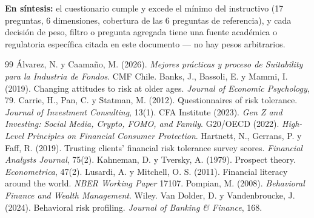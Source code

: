 \documentclass[11pt]{article}
\begin{document}
\begin{callout}
\textbf{En síntesis:} el cuestionario cumple y excede el mínimo del instructivo (17 preguntas, 6 dimensiones, cobertura de las 6 preguntas de referencia), y cada decisión de peso, filtro o pregunta agregada tiene una fuente académica o regulatoria específica citada en este documento --- no hay pesos arbitrarios.
\end{callout}

\begin{thebibliography}{99}
 Álvarez, N. y Caamaño, M. (2026). \textit{Mejores prácticas y proceso de Suitability para la Industria de Fondos}. CMF Chile.
 Banks, J., Bassoli, E. y Mammi, I. (2019). Changing attitudes to risk at older ages. \textit{Journal of Economic Psychology}, 79.
 Carrie, H., Pan, C. y Statman, M. (2012). Questionnaires of risk tolerance. \textit{Journal of Investment Consulting}, 13(1).
 CFA Institute (2023). \textit{Gen Z and Investing: Social Media, Crypto, FOMO, and Family}.
 G20/OECD (2022). \textit{High-Level Principles on Financial Consumer Protection}.
 Hartnett, N., Gerrans, P. y Faff, R. (2019). Trusting clients' financial risk tolerance survey scores. \textit{Financial Analysts Journal}, 75(2).
 Kahneman, D. y Tversky, A. (1979). Prospect theory. \textit{Econometrica}, 47(2).
 Lusardi, A. y Mitchell, O. S. (2011). Financial literacy around the world. \textit{NBER Working Paper} 17107.
 Pompian, M. (2008). \textit{Behavioral Finance and Wealth Management}. Wiley.
 Van Dolder, D. y Vandenbroucke, J. (2024). Behavioral risk profiling. \textit{Journal of Banking \& Finance}, 168.
\end{thebibliography}
\end{document}
